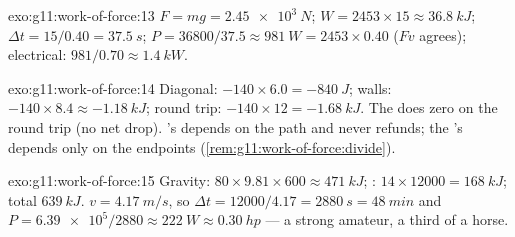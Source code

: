 \begin{solution}{exo:g11:work-of-force:13}
$F = mg = \qty{2.45e3}{N}$; $W = 2453 \times 15 \approx \qty{36.8}{kJ}$;
$\Delta t = 15/0.40 = \qty{37.5}{s}$;
$P = 36800/37.5 \approx \qty{981}{W} = 2453 \times 0.40$ ($Fv$ agrees);
electrical: $981/0.70 \approx \qty{1.4}{kW}$.
\end{solution}

\begin{solution}{exo:g11:work-of-force:14}
Diagonal: $-140 \times 6.0 = -\qty{840}{J}$; walls:
$-140 \times 8.4 \approx -\qty{1.18}{kJ}$; round trip:
$-140 \times 12 = -\qty{1.68}{kJ}$. The  does zero on the round
trip (no net drop). 's  depends on the path and never
refunds; the 's depends only on the endpoints
(\cref{rem:g11:work-of-force:divide}).
\end{solution}

\begin{solution}{exo:g11:work-of-force:15}
Gravity: $80 \times 9.81 \times 600 \approx \qty{471}{kJ}$; :
$14 \times 12000 = \qty{168}{kJ}$; total $\qty{639}{kJ}$.
$v = \qty{4.17}{m/s}$, so $\Delta t = 12000/4.17 = \qty{2880}{s} =
\qty{48}{min}$ and $P = \num{6.39e5}/2880 \approx \qty{222}{W} \approx
\qty{0.30}{hp}$ --- a strong amateur, a third of a horse.
\end{solution}

